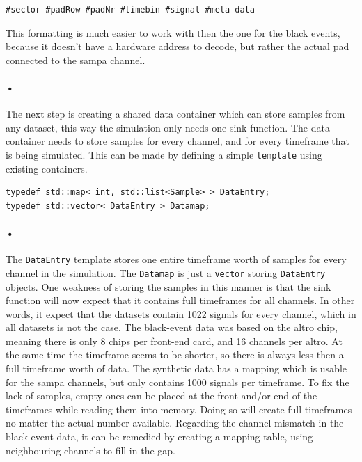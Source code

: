 \documentclass[a4paper, 12pt]{report}
\newcommand{\codeword}[1]{\texttt{#1}}
\begin{document}
\begin{lstlisting}[caption=Data container., label=lst:black-event-format]
#sector #padRow #padNr #timebin #signal #meta-data

\end{lstlisting}
This formatting is much easier to work with then the one for the black events, because it doesn't have a hardware address to decode, but rather the actual pad connected to the \gls{sampa} channel.

\paragraph{•}
The next step is creating a shared data container which can store samples from any dataset, this way the simulation only needs one sink function.
The data container needs to store samples for every channel, and for every timeframe that is being simulated.
This can be made by defining a simple \codeword{template} using existing containers.

\begin{lstlisting}[caption=Data container., label=lst:data-template]
typedef std::map< int, std::list<Sample> > DataEntry;
typedef std::vector< DataEntry > Datamap;
\end{lstlisting}

\paragraph{•}
The \codeword{DataEntry} template stores one entire timeframe worth of samples for every channel in the simulation.
The \codeword{Datamap} is just a \codeword{vector} storing \codeword{DataEntry} objects.
One weakness of storing the samples in this manner is that the sink function will now expect that it contains full timeframes for all channels.
In other words, it expect that the datasets contain 1022 signals for every channel, which in all datasets is not the case.
The black-event data was based on the \gls{altro} chip, meaning there is only 8 chips per front-end card, and 16 channels per \gls{altro}.
At the same time the timeframe seems to be shorter, so there is always less then a full timeframe worth of data.
The synthetic data has a mapping which is usable for the \gls{sampa} channels, but only contains 1000 signals per timeframe.
To fix the lack of samples, empty ones can be placed at the front and/or end of the timeframes while reading them into memory.
Doing so will create full timeframes no matter the actual number available.
Regarding the channel mismatch in the black-event data, it can be remedied by creating a mapping table, using neighbouring channels to fill in the gap.
\end{document}
